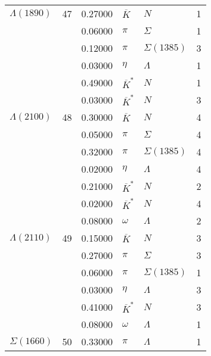 \documentclass[a4paper,10pt]{article}
\begin{document}
\begin{tabular}[t]{|lr|l|ll|l|} 
\hline
$      \Lambda(1890) $& 47& 0.27000&$ \overline{K}        $ &$ N                   $& 1\\
$                    $&   & 0.06000&$ \pi                 $ &$ \Sigma              $& 1\\
$                    $&   & 0.12000&$ \pi                 $ &$ \Sigma(1385)        $& 3\\
$                    $&   & 0.03000&$ \eta                $ &$ \Lambda             $& 1\\
$                    $&   & 0.49000&$ \overline{K}^*      $ &$ N                   $& 1\\
$                    $&   & 0.03000&$ \overline{K}^*      $ &$ N                   $& 3\\
\hline
$      \Lambda(2100) $& 48& 0.30000&$ \overline{K}        $ &$ N                   $& 4\\
$                    $&   & 0.05000&$ \pi                 $ &$ \Sigma              $& 4\\
$                    $&   & 0.32000&$ \pi                 $ &$ \Sigma(1385)        $& 4\\
$                    $&   & 0.02000&$ \eta                $ &$ \Lambda             $& 4\\
$                    $&   & 0.21000&$ \overline{K}^*      $ &$ N                   $& 2\\
$                    $&   & 0.02000&$ \overline{K}^*      $ &$ N                   $& 4\\
$                    $&   & 0.08000&$ \omega              $ &$ \Lambda             $& 2\\
\hline
$      \Lambda(2110) $& 49& 0.15000&$ \overline{K}        $ &$ N                   $& 3\\
$                    $&   & 0.27000&$ \pi                 $ &$ \Sigma              $& 3\\
$                    $&   & 0.06000&$ \pi                 $ &$ \Sigma(1385)        $& 1\\
$                    $&   & 0.03000&$ \eta                $ &$ \Lambda             $& 3\\
$                    $&   & 0.41000&$ \overline{K}^*      $ &$ N                   $& 3\\
$                    $&   & 0.08000&$ \omega              $ &$ \Lambda             $& 1\\
\hline
$      \Sigma(1660)  $& 50& 0.33000&$ \pi                 $ &$ \Lambda             $& 1\\

\end{tabular}
\end{document}
